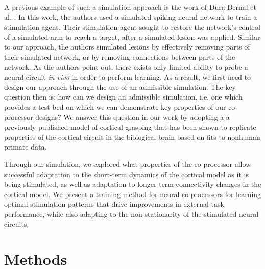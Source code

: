 \documentclass[12pt]{iopart}
\begin{document}
A previous example of such a simulation approach is the work of Dura-Bernal et al.
\cite{bernal.sim}. In this work, the authors used a simulated spiking neural network
to train a stimulation agent. Their stimulation agent sought to restore the network's
control of a simulated arm to reach a target, after a simulated lesion was
applied. Similar to our approach, the authors simulated lesions by effectively removing parts
of their simulated network, or by removing connections between parts of the network.
As the authors point out, there exists only limited ability to probe a neural circuit
\textit{in vivo} in order to perform learning. As a result, we first need to design
our approach through the use of an admissible simulation. The key question then is:
how can we design an admissible simulation, i.e. one which provides a test bed on
which we can demonstrate key properties of our co-processor designs? We answer this question in our
work by adopting a a previously published model of cortical grasping \cite{michaels.mrnn} that has
been shown to replicate properties of the cortical circuit in the biological brain based on fits to
nonhuman primate data.

Through our simulation, we explored what properties of the co-processor allow successful
adaptation to the short-term dynamics of the cortical model as it is being stimulated,
as well as adaptation to longer-term connectivity changes in the cortical model.
We present a training method for neural co-processors for learning optimal stimulation
patterns that drive improvements in external task performance, while also adapting to the
non-stationarity of the stimulated neural circuits.

\section{Methods}
\end{document}
